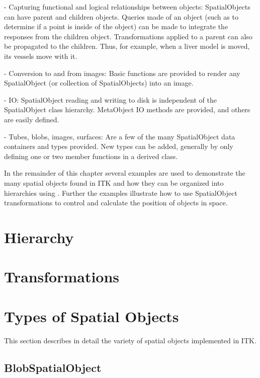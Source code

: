 -	Capturing functional and logical relationships between objects: SpatialObjects can have parent and children objects.  Queries made of an object (such as to determine if a point is inside of the object) can be made to integrate the responses from the children object.   Transformations applied to a parent can also be propagated to the children.  Thus, for example, when a liver model is moved, its vessels move with it.

-	Conversion to and from images: Basic functions are provided to render any SpatialObject (or collection of SpatialObjects) into an image.

-	IO: SpatialObject reading and writing to disk is independent of the SpatialObject class hierarchy.  MetaObject IO methods are provided, and others are easily defined.

-	Tubes, blobs, images, surfaces: Are a few of the many SpatialObject data containers and types provided.  New types can be added, generally by only defining one or two member functions in a derived class.

In the remainder of this chapter several examples are used to demonstrate
the many spatial objects found in ITK and how they can be organized into
hierarchies using . Further the examples
illustrate how to use SpatialObject transformations to control and 
calculate the position of objects in space.

\section{Hierarchy}
\label{sec:SpatialObjectHierarchy}
\ifitkFullVersion 

\fi 


\section{Transformations}
\label{sec:SpatialObjectTransforms}
\ifitkFullVersion 

\fi

\section{Types of Spatial Objects}
\label{sec:Principal Objects}

This section describes in detail the variety of spatial objects 
implemented in ITK. 

\subsection{BlobSpatialObject}
\label{sec:BlobSpatialObject}
\ifitkFullVersion 

\fi

